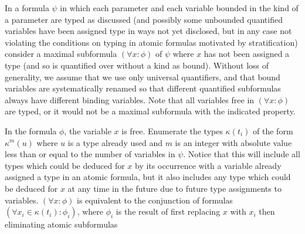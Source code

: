 \documentclass[12pt]{article}
\begin{document}
In a formula $\psi$ in which each parameter and each variable bounded in the kind of a parameter are typed as discussed (and possibly some unbounded quantified variables have been assigned type in ways not yet disclosed, but in any case not violating the conditions on typing in atomic formulas motivated by stratification) consider
a maximal subformula $(\forall x:\phi)$ of $\psi$ where $x$ has not been assigned a type (and so is quantified over without a kind as bound).  Without loss of generality, we assume that we use only universal quantifiers, and that
bound variables are systematically renamed so that different quantified subformulas always have different binding variables.  Note that all variables free in $(\forall x:\phi)$ are typed, or it would not be a maximal subformula with the indicated property.

In the formula $\phi$, the variable $x$ is free.
Enumerate the types $\kappa(t_i)$ of the form $\kappa^m(u)$ where $u$ is a type already used and $m$ is an integer with absolute value less than or equal to the number of variables in $\psi$.  Notice that this will include all types which could be deduced for $x$ by its occurrence with a variable already assigned a type in an atomic formula, but it also includes any type which could be deduced for $x$ at any time in the future due to future type assignments to variables.  $(\forall x:\phi)$ is equivalent to the conjunction of formulas $(\forall x_i \in \kappa(t_i):\phi_i)$, where $\phi_i$ is the result of first replacing $x$ with $x_i$ then eliminating atomic subformulas
\end{document}

